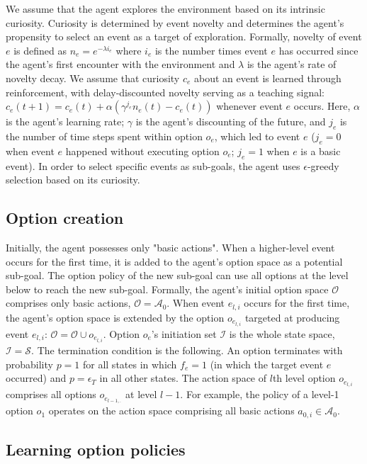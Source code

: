 \documentclass{article}
\begin{document}
We assume that the agent explores the environment based on its intrinsic curiosity. Curiosity is determined by event novelty and determines the agent's propensity to select an event as a target of exploration. Formally, novelty of event $e$ is defined as $n_e = e^{-\lambda i_e}$ where $i_e$ is the number times event $e$ has occurred since the agent's first encounter with the environment and $\lambda$ is the agent's rate of novelty decay. We assume that curiosity $c_e$ about an event is learned through reinforcement, with delay-discounted novelty serving as a teaching signal: $c_e(t+1) = c_e(t) + \alpha (\gamma^{j_e} n_e(t) - c_e(t))$ whenever event $e$ occurs. Here, $\alpha$ is the agent's learning rate; $\gamma$ is the agent's discounting of the future, and $j_e$ is the number of time steps spent within option $o_e$, which led to event $e$ ($j_e = 0$ when event $e$ happened without executing option $o_e$; $j_e = 1$ when $e$ is a basic event). In order to select specific events as sub-goals, the agent uses $\epsilon$-greedy selection based on its curiosity.

\subsection{Option creation}

Initially, the agent possesses only "basic actions". When a higher-level event occurs for the first time, it is added to the agent's option space as a potential sub-goal. The option policy of the new sub-goal can use all options at the level below to reach the new sub-goal. Formally, the agent's initial option space $\mathcal{O}$ comprises only basic actions, $\mathcal{O} = \mathcal{A}_0$. When event $e_{l, i}$ occurs for the first time, the agent's option space is extended by the option $o_{e_{l, i}}$ targeted at producing event $e_{l, i}$: $\mathcal{O} = \mathcal{O} \cup o_{e_{l, i}}$. Option $o_e$'s initiation set $\mathcal{I}$ is the whole state space, $\mathcal{I} = \mathcal{S}$. The termination condition is the following. An option terminates with probability $p=1$ for all states in which $f_e = 1$ (in which the target event $e$ occurred) and $p = \epsilon_T$ in all other states. The action space of $l$th level option $o_{e_{l, i}}$ comprises all options $o_{e_{l-1, .}}$ at level $l-1$. For example, the policy of a level-1 option $o_1$ operates on the action space comprising all basic actions $a_{0, i} \in \mathcal{A}_0$. 

\subsection{Learning option policies}
\end{document}
